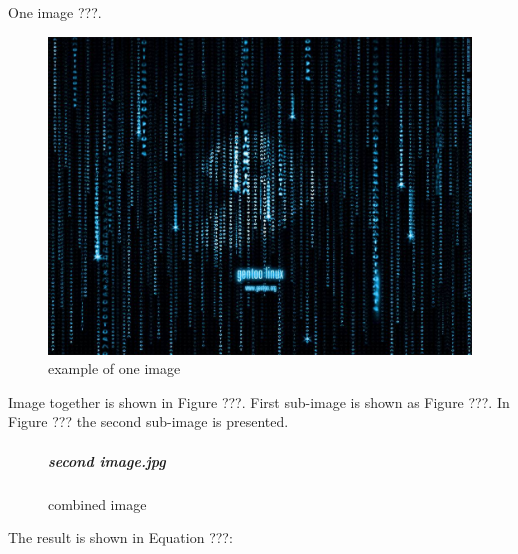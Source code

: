 \documentclass[•]{article}
\begin{document}
One image ???.
	\begin{figure}[!htbp]
	\centering
	\includegraphics[scale=0.1]{image.jpg}
	\caption{example of one image	} \label{one image}
	\end{figure}

Image together is shown in Figure ???.
First sub-image is shown as Figure ???.
In Figure ??? the second sub-image is presented.
	\begin{figure}[!htbp]
	\centering
	\qquad

	\subparagraph{second image.jpg}
	\label{sub2}
	
	\caption{combined image}
	\label{img-together}
	\end{figure}

\begin{flushleft}
The result is shown in Equation ???:

\end{flushleft}
	
\end{document}
